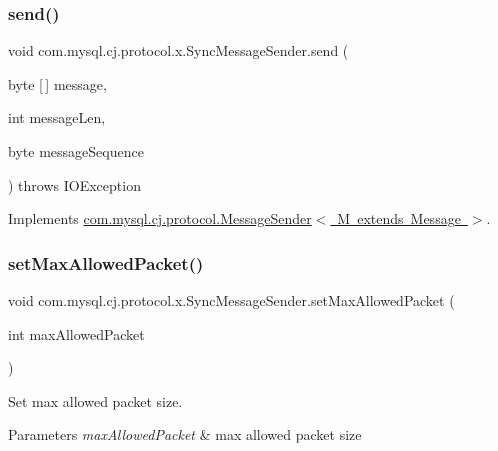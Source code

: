 \subsubsection{\texorpdfstring{send()}{send()}\hspace{0.1cm}{\footnotesize\ttfamily [2/2]}}
{\footnotesize\ttfamily void com.\+mysql.\+cj.\+protocol.\+x.\+Sync\+Message\+Sender.\+send (\begin{DoxyParamCaption}\item[{byte \mbox{[}$\,$\mbox{]}}]{message,  }\item[{int}]{message\+Len,  }\item[{byte}]{message\+Sequence }\end{DoxyParamCaption}) throws I\+O\+Exception}



Implements \mbox{\hyperlink{interfacecom_1_1mysql_1_1cj_1_1protocol_1_1_message_sender_a0c7192449eae4aa0f0dbbc9778dac002}{com.\+mysql.\+cj.\+protocol.\+Message\+Sender$<$ M extends Message $>$}}.

\mbox{\label{classcom_1_1mysql_1_1cj_1_1protocol_1_1x_1_1_sync_message_sender_aa403c14cdcc078b9250830c85f6dbbf9}} 
\subsubsection{\texorpdfstring{set\+Max\+Allowed\+Packet()}{setMaxAllowedPacket()}}
{\footnotesize\ttfamily void com.\+mysql.\+cj.\+protocol.\+x.\+Sync\+Message\+Sender.\+set\+Max\+Allowed\+Packet (\begin{DoxyParamCaption}\item[{int}]{max\+Allowed\+Packet }\end{DoxyParamCaption})}

Set max allowed packet size.


\begin{DoxyParams}{Parameters}
{\em max\+Allowed\+Packet} & max allowed packet size \\
\hline
\end{DoxyParams}


